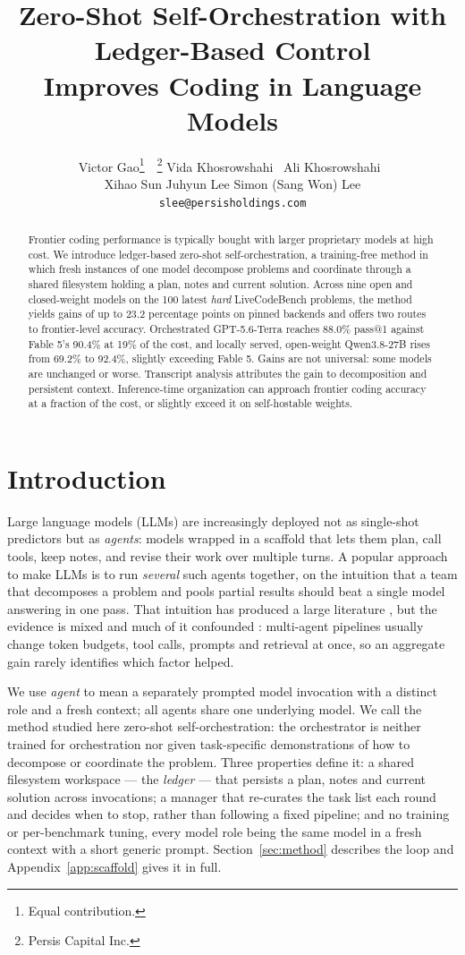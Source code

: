 \documentclass{article}
\title{Zero-Shot Self-Orchestration with Ledger-Based Control \\
Improves Coding in Language Models}
\author{%
  Victor Gao\thanks{Equal contribution.}\ \ \thanks{Persis Capital Inc.} \quad
  Vida Khosrowshahi\footnotemark[1]\ \footnotemark[2] \quad
  Ali Khosrowshahi\footnotemark[1]\ \footnotemark[2] \\
  Xihao Sun\footnotemark[2] \quad
  Juhyun Lee \quad
  Simon (Sang Won) Lee\footnotemark[2] \\
  \texttt{slee@persisholdings.com}
}
\newif\ifcameraready
\begin{document}
\maketitle
\ifcameraready\else{}\fi

\begin{abstract}
Frontier coding performance is typically bought with larger proprietary models at high
cost. We introduce ledger-based zero-shot self-orchestration, a training-free method in
which fresh instances of one model decompose problems and coordinate through a shared
filesystem holding a plan, notes and current solution. Across nine open and closed-weight
models on the 100 latest \emph{hard} LiveCodeBench problems, the method yields gains of up
to 23.2 percentage points on pinned backends and offers two routes to frontier-level
accuracy. Orchestrated GPT-5.6-Terra reaches 88.0\% pass@1 against Fable 5's 90.4\% at 19\%
of the cost, and locally served, open-weight Qwen3.8-27B rises from 69.2\% to 92.4\%,
slightly exceeding Fable 5. Gains are not universal: some models are unchanged or worse.
Transcript analysis attributes the gain to decomposition and persistent context.
Inference-time organization can approach frontier coding accuracy at a fraction of the cost,
or slightly exceed it on self-hostable weights.
\end{abstract}

\section{Introduction}
\label{sec:intro}

Large language models (LLMs) are increasingly deployed not as single-shot predictors but as
\emph{agents}: models wrapped in a scaffold that lets them plan, call tools, keep notes,
and revise their work over multiple turns. A popular approach to make LLMs is to run \emph{several}
such agents together, on the intuition that a team that decomposes a problem and pools
partial results should beat a single model answering in one pass. That intuition has
produced a large literature \citep{guo2024}, but the evidence is mixed \citep{wangq2024}
and much of it confounded \citep{tran2026}: multi-agent pipelines usually change token
budgets, tool calls, prompts and retrieval at once, so an aggregate gain rarely identifies
which factor helped.

We use \emph{agent} to mean a separately prompted model invocation with a distinct role and
a fresh context; all agents share one underlying model. We call the method studied here
zero-shot self-orchestration: the orchestrator is neither trained for orchestration nor
given task-specific demonstrations of how to decompose or coordinate the problem. Three
properties define it: a shared filesystem workspace --- the \emph{ledger} --- that persists
a plan, notes and current solution across invocations; a manager that re-curates the task
list each round and decides when to stop, rather than following a fixed pipeline; and no
training or per-benchmark tuning, every model role being the same model in a fresh context
with a short generic prompt. Section~\ref{sec:method} describes the loop and
Appendix~\ref{app:scaffold} gives it in full.
\end{document}
